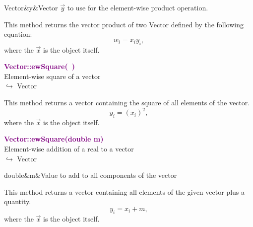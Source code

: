 \begin{tcolorbox}[width=\textwidth,myArgs,tabularx={ll|R}]
Vector&y&Vector $\overrightarrow{y}$ to use for the element-wise product operation.
\end{tcolorbox}

This method returns the vector product of two Vector defined by the following equation:
\begin{equation*}
w_i = x_i y_i,
\end{equation*}
where the $\overrightarrow{x}$ is the object itself.

\textcolor{purple}{\textbf{Vector::ewSquare(~)}}\label{Vector::ewSquare()}\\
Element-wise square of a vector\\ \hspace*{10mm}$\hookrightarrow$ Vector

This method returns a vector containing the square of all elements of the vector.
\begin{equation*}
y_i = (x_i)^2,
\end{equation*}
where the $\overrightarrow{x}$ is the object itself.

\textcolor{purple}{\textbf{Vector::ewSquare(double m)}}\label{Vector::ewSquare(double m)}\\
Element-wise addition of a real to a vector\\ \hspace*{10mm}$\hookrightarrow$ Vector

\begin{tcolorbox}[width=\textwidth,myArgs,tabularx={ll|R}]
double&m&Value to add to all components of the vector
\end{tcolorbox}

This method returns a vector containing all elements of the given vector plus a quantity.
\begin{equation*}
y_i = x_i + m,
\end{equation*}
where the $\overrightarrow{x}$ is the object itself.

